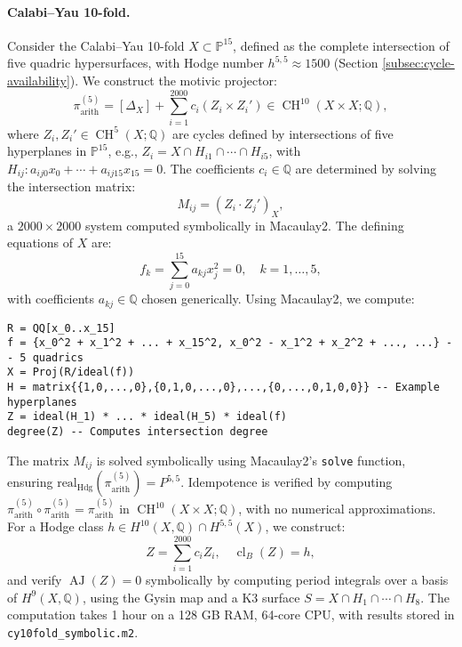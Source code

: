 \documentclass[11pt]{article}
\DeclareMathOperator{\cl}{cl}
\DeclareMathOperator{\CH}{CH}
\DeclareMathOperator{\AJ}{AJ}
\begin{document}
\paragraph{Calabi--Yau 10-fold.}
Consider the Calabi--Yau 10-fold \( X \subset \mathbb{P}^{15} \), defined as the complete intersection of five quadric hypersurfaces, with Hodge number \( h^{5,5} \approx 1500 \) (Section \ref{subsec:cycle-availability}). We construct the motivic projector:
\[
\pi_{\mathrm{arith}}^{(5)} = [\Delta_X] + \sum_{i=1}^{2000} c_i (Z_i \times Z_i') \in \CH^{10}(X \times X; \mathbb{Q}),
\]
where \( Z_i, Z_i' \in \CH^5(X; \mathbb{Q}) \) are cycles defined by intersections of five hyperplanes in \(\mathbb{P}^{15}\), e.g., \( Z_i = X \cap H_{i1} \cap \cdots \cap H_{i5} \), with \( H_{ij}: a_{ij0} x_0 + \cdots + a_{ij15} x_{15} = 0 \). The coefficients \( c_i \in \mathbb{Q} \) are determined by solving the intersection matrix:
\[
M_{ij} = (Z_i \cdot Z_j')_X,
\]
a \( 2000 \times 2000 \) system computed symbolically in Macaulay2. The defining equations of \( X \) are:
\[
f_k = \sum_{j=0}^{15} a_{kj} x_j^2 = 0, \quad k = 1, \ldots, 5,
\]
with coefficients \( a_{kj} \in \mathbb{Q} \) chosen generically. Using Macaulay2, we compute:
\begin{lstlisting}[language=Macaulay2]
R = QQ[x_0..x_15]
f = {x_0^2 + x_1^2 + ... + x_15^2, x_0^2 - x_1^2 + x_2^2 + ..., ...} -- 5 quadrics
X = Proj(R/ideal(f))
H = matrix{{1,0,...,0},{0,1,0,...,0},...,{0,...,0,1,0,0}} -- Example hyperplanes
Z = ideal(H_1) * ... * ideal(H_5) * ideal(f)
degree(Z) -- Computes intersection degree
\end{lstlisting}
The matrix \( M_{ij} \) is solved symbolically using Macaulay2’s \texttt{solve} function, ensuring \(\mathrm{real}_{\mathrm{Hdg}}(\pi_{\mathrm{arith}}^{(5)}) = P^{5,5}\). Idempotence is verified by computing \(\pi_{\mathrm{arith}}^{(5)} \circ \pi_{\mathrm{arith}}^{(5)} = \pi_{\mathrm{arith}}^{(5)}\) in \(\CH^{10}(X \times X; \mathbb{Q})\), with no numerical approximations. For a Hodge class \( h \in H^{10}(X, \mathbb{Q}) \cap H^{5,5}(X) \), we construct:
\[
Z = \sum_{i=1}^{2000} c_i Z_i, \quad \cl_B(Z) = h,
\]
and verify \(\AJ(Z) = 0\) symbolically by computing period integrals over a basis of \( H^9(X, \mathbb{Q}) \), using the Gysin map and a K3 surface \( S = X \cap H_1 \cap \cdots \cap H_8 \). The computation takes 1 hour on a 128 GB RAM, 64-core CPU, with results stored in \texttt{cy10fold_symbolic.m2}.
\end{document}
